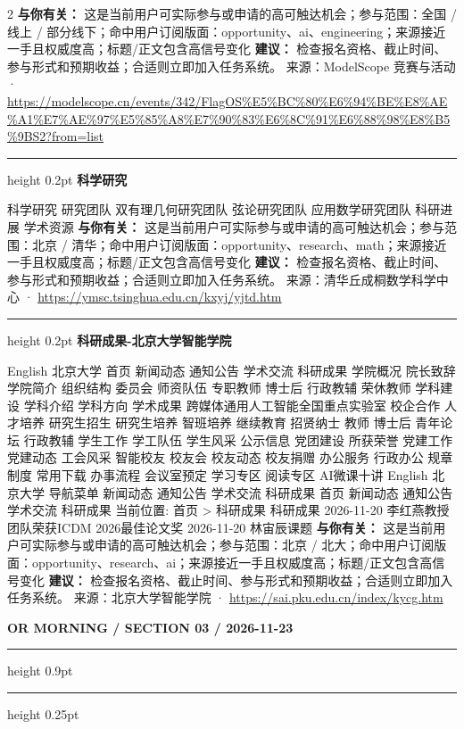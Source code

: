 \documentclass[10.5pt]{ctexart}
\begin{document}
\begin{multicols}{2}
\textbf{与你有关：} 这是当前用户可实际参与或申请的高可触达机会；参与范围：全国 / 线上 / 部分线下；命中用户订阅版面：opportunity、ai、engineering；来源接近一手且权威度高；标题/正文包含高信号变化
\textbf{建议：} 检查报名资格、截止时间、参与形式和预期收益；合适则立即加入任务系统。
{\footnotesize\color{ormuted} 来源：ModelScope 竞赛与活动 · \url{https://modelscope.cn/events/342/FlagOS%E5%BC%80%E6%94%BE%E8%AE%A1%E7%AE%97%E5%85%A8%E7%90%83%E6%8C%91%E6%88%98%E8%B5%9BS2?from=list}}
\vspace{2mm}
\hrule height 0.2pt
\vspace{2mm}
{\large\bfseries 科学研究}\par
科学研究 研究团队 双有理几何研究团队 弦论研究团队 应用数学研究团队 科研进展 学术资源
\textbf{与你有关：} 这是当前用户可实际参与或申请的高可触达机会；参与范围：北京 / 清华；命中用户订阅版面：opportunity、research、math；来源接近一手且权威度高；标题/正文包含高信号变化
\textbf{建议：} 检查报名资格、截止时间、参与形式和预期收益；合适则立即加入任务系统。
{\footnotesize\color{ormuted} 来源：清华丘成桐数学科学中心 · \url{https://ymsc.tsinghua.edu.cn/kxyj/yjtd.htm}}
\vspace{2mm}
\hrule height 0.2pt
\vspace{2mm}
{\large\bfseries 科研成果-北京大学智能学院}\par
English 北京大学 首页 新闻动态 通知公告 学术交流 科研成果 学院概况 院长致辞 学院简介 组织结构 委员会 师资队伍 专职教师 博士后 行政教辅 荣休教师 学科建设 学科介绍 学科方向 学术成果 跨媒体通用人工智能全国重点实验室 校企合作 人才培养 研究生招生 研究生培养 智班培养 继续教育 招贤纳士 教师 博士后 青年论坛 行政教辅 学生工作 学工队伍 学生风采 公示信息 党团建设 所获荣誉 党建工作 党建动态 工会风采 智能校友 校友会 校友动态 校友捐赠 办公服务 行政办公 规章制度 常用下载 办事流程 会议室预定 学习专区 阅读专区 AI微课十讲 English 北京大学 导航菜单 新闻动态 通知公告 学术交流 科研成果 首页 新闻动态 通知公告 学术交流 科研成果 当前位置: 首页 > 科研成果 科研成果 2026-11-20 李红燕教授团队荣获ICDM 2026最佳论文奖 2026-11-20 林宙辰课题
\textbf{与你有关：} 这是当前用户可实际参与或申请的高可触达机会；参与范围：北京 / 北大；命中用户订阅版面：opportunity、research、ai；来源接近一手且权威度高；标题/正文包含高信号变化
\textbf{建议：} 检查报名资格、截止时间、参与形式和预期收益；合适则立即加入任务系统。
{\footnotesize\color{ormuted} 来源：北京大学智能学院 · \url{https://sai.pku.edu.cn/index/kycg.htm}}
\end{multicols}
\newpage
{\small\bfseries OR MORNING / SECTION 03 / 2026-11-23}
\vspace{2mm}
\hrule height 0.9pt
\vspace{1.5mm}
\hrule height 0.25pt
\vspace{4mm}
\end{document}
